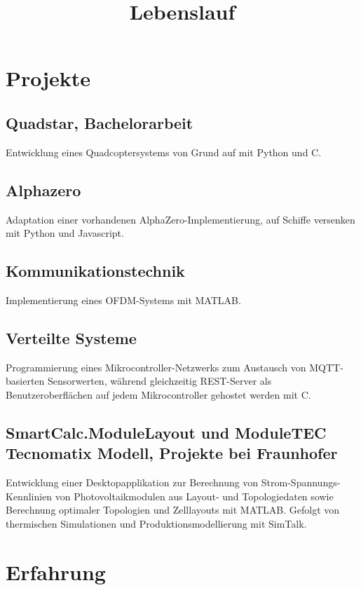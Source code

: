 \documentclass[10pt, a4paper, sans]{moderncv}
\title{Lebenslauf}
\begin{document}

\makecvtitle

\vspace{-1cm}

\section{Projekte}
\subsection*{Quadstar, Bachelorarbeit}
Entwicklung eines Quadcoptersystems von Grund auf mit Python und C.
\subsection*{Alphazero}
Adaptation einer vorhandenen AlphaZero-Implementierung, auf Schiffe versenken mit Python und Javascript.
\subsection{Kommunikationstechnik}
Implementierung eines OFDM-Systems mit MATLAB.
\subsection{Verteilte Systeme}
Programmierung eines Mikrocontroller-Netzwerks zum Austausch von MQTT-basierten Sensorwerten, während gleichzeitig REST-Server als Benutzeroberflächen auf jedem Mikrocontroller gehostet werden mit C.
\subsection{SmartCalc.ModuleLayout und ModuleTEC Tecnomatix Modell, Projekte bei Fraunhofer}
Entwicklung einer Desktopapplikation zur Berechnung von Strom-Spannungs-Kennlinien von Photovoltaikmodulen aus Layout- und Topologiedaten sowie Berechnung optimaler Topologien und Zelllayouts mit MATLAB. Gefolgt von thermischen Simulationen und Produktionsmodellierung mit SimTalk.

\section{Erfahrung}
\end{document}
